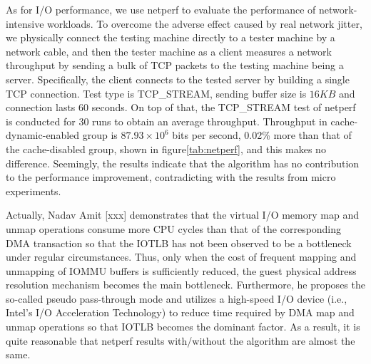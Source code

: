 As for I/O performance, we use netperf to evaluate the performance of network-intensive workloads. To overcome the adverse effect caused by real network jitter, we physically connect the testing machine directly to a tester machine by a network cable, and then the tester machine as a client measures a network throughput by sending a bulk of TCP packets to the testing machine being a server. Specifically, the client connects to the tested server by building a single TCP connection. Test type is TCP\_STREAM, sending buffer size is $16KB$ and connection lasts $60$ seconds. On top of that, the TCP\_STREAM test of netperf is conducted for $30$ runs to obtain an average throughput. Throughput in cache-dynamic-enabled group is $87.93 \times 10^6$ bits per second, 0.02\% more than that of the cache-disabled group, shown in figure\ref{tab:netperf}, and this makes no difference.
Seemingly, the results indicate that the algorithm has no contribution to the performance improvement, contradicting with the results from micro experiments.

Actually, Nadav Amit [xxx] demonstrates that the virtual I/O memory map and unmap operations consume more CPU cycles than  that of the corresponding DMA transaction so that the IOTLB has not been observed to be a bottleneck under regular circumstances. Thus, only when the cost of frequent mapping and unmapping of IOMMU buffers is sufficiently reduced, the guest physical address resolution mechanism becomes the main bottleneck. Furthermore, he proposes the so-called pseudo pass-through mode and utilizes a high-speed I/O device (i.e., Intel’s I/O Acceleration Technology) to reduce time required by DMA map and unmap operations so that IOTLB becomes the dominant factor. As a result, it is quite reasonable that netperf results with/without the algorithm are almost the same.








